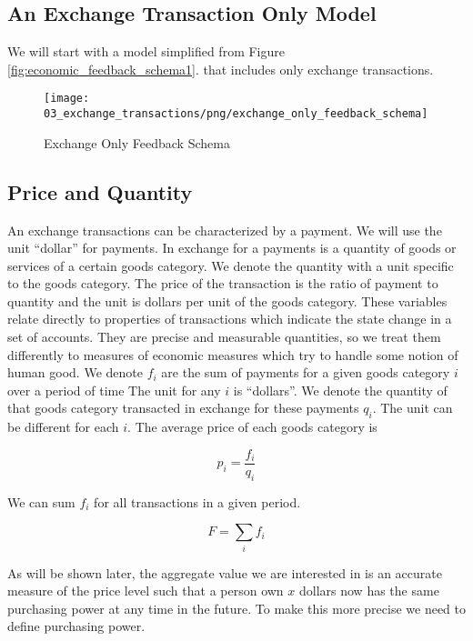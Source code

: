 \subsection{An Exchange Transaction Only Model}

We will start with a model simplified from Figure \ref{fig:economic_feedback_schema1}. that includes only
exchange transactions.

\begin{figure}[H]
\centering
\texttt{[image: 03\_exchange\_transactions/png/exchange\_only\_feedback\_schema]}
\caption{Exchange Only Feedback Schema}
\label{fig:exchange_only_feedback_schema1}
\end{figure}

\subsection{Price and Quantity}

An exchange transactions can be characterized by a payment. We will use the unit ``dollar''
for payments. In exchange for a payments is a quantity of goods or services of a certain goods
category. We denote the quantity with a unit specific to the goods category. The price of the
transaction is the ratio of payment to quantity and the unit is dollars per unit of the goods
category. These variables relate directly to properties of transactions which indicate the state
change in a set of accounts. They are precise and measurable quantities, so we treat them
differently to measures of economic measures which try to handle some notion of human good. We
denote $f_i$ are the sum of payments for a given goods category $i$ over a period of time The unit
for any $i$ is ``dollars''. We denote the quantity of that goods category transacted in
exchange for these payments $q_i$. The unit can be different for each $i$. The average price of each
goods category is 

\[
    p_i = \frac {f_i} {q_i}
\]

We can sum $f_i$ for all transactions in a given period.

\begin{equation}\label{equation:f}
    F = \sum_i f_i
\end{equation}

As will be shown later, the aggregate value we are interested in is an accurate measure of the price
level such that a person own $x$ dollars now has the same purchasing power at any time in the
future. To make this more precise we need to define purchasing power. 

